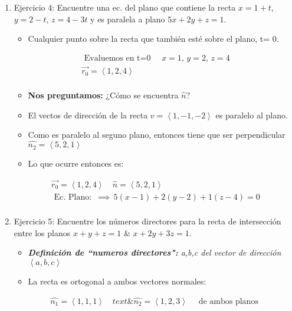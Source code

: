 \begin{enumerate}
    \item Ejercicio 4: Encuentre una ec. del plano que contiene  la recta $x=1+t$, $y=2-t$, $z=4-3t$ y es paralela a plano $5x+2y+z=1$.
        \begin{itemize}
            \item Cualquier punto sobre la recta que también esté sobre el plano, t= 0. 
        \end{itemize}
        \begin{align*}
            \text{  Evaluemos en t=0  } \quad x=1, \, y=2, \, z=4\\
            \vec{r_0}= \left\langle 1,2,4 \right\rangle  \\ 
        \end{align*}
        \begin{itemize}
            \item \textbf{Nos preguntamos:} ¿Cómo se encuentra $\hat{n}$?
            \item El vectos de dirección de la recta $v=\left\langle 1,-1,-2 \right\rangle$ es paralelo al plano.
            \item Como es paralelo al seguno plano, entonces tiene que ser perpendicular $\hat{n_2} = \left\langle 5,2,1 \right\rangle$
            \item Lo que ocurre entonces es:
        \end{itemize}
            \begin{align*}
                \vec{r_0} = \left\langle 1,2,4 \right\rangle \quad \hat{n}= \left\langle 5,2,1 \right\rangle \\ 
                \text{  Ec. Plano:  } \, \implies \, 5(x-1) + 2(y-2)+1(z-4)=0 \\ 
            \end{align*}
    \item Ejercicio 5: Encuentre los números directores para la recta de intersección entre los planos $x+y+z=1$ \& $x+2y+3z=1$.
            \begin{itemize}
                \item \emph{\textbf{Definición de ``numeros directores":} a,b,c del vector de dirección $\left\langle a,b,c \right\rangle $}
                \item La recta es ortogonal a ambos vectores normales:
            \end{itemize}
            \begin{align*}
                \hat{n_1} = \left\langle 1,1,1 \right\rangle \quad text{ \& } \hat{n_2} = \left\langle 1,2,3 \right\rangle \quad \text{  de ambos planos  }\\

\end{align*}
\end{enumerate}
